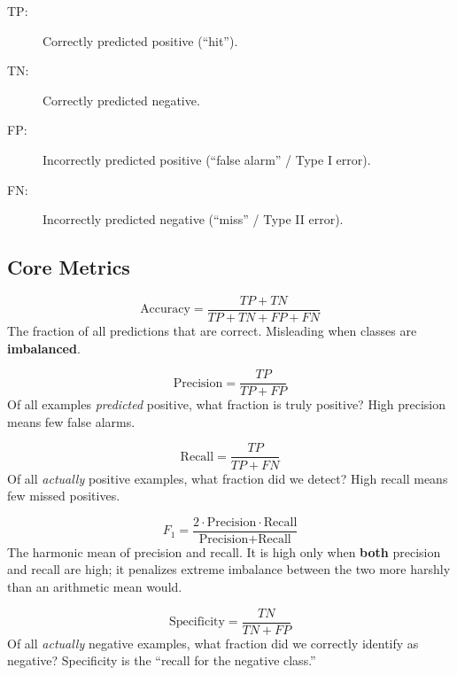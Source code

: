 \begin{description}
    \item[TP:] Correctly predicted positive (``hit'').
    \item[TN:] Correctly predicted negative.
    \item[FP:] Incorrectly predicted positive (``false alarm'' / Type I error).
    \item[FN:] Incorrectly predicted negative (``miss'' / Type II error).
\end{description}

\subsection*{Core Metrics}

\begin{definition}[Accuracy]
$$\text{Accuracy} = \frac{TP + TN}{TP + TN + FP + FN}$$
The fraction of all predictions that are correct. Misleading when classes are \textbf{imbalanced}.
\end{definition}

\begin{definition}[Precision]
$$\text{Precision} = \frac{TP}{TP + FP}$$
Of all examples \textit{predicted} positive, what fraction is truly positive? High precision means few false alarms.
\end{definition}

\begin{definition}
$$\text{Recall} = \frac{TP}{TP + FN}$$
Of all \textit{actually} positive examples, what fraction did we detect? High recall means few missed positives.
\end{definition}

\begin{definition}[F1 Score]
$$F_1 = \frac{2 \cdot \text{Precision} \cdot \text{Recall}}{\text{Precision} + \text{Recall}}$$
The harmonic mean of precision and recall. It is high only when \textbf{both} precision and recall are high; it penalizes extreme imbalance between the two more harshly than an arithmetic mean would.
\end{definition}

\begin{definition}[Specificity]
$$\text{Specificity} = \frac{TN}{TN + FP}$$
Of all \textit{actually} negative examples, what fraction did we correctly identify as negative? Specificity is the ``recall for the negative class.''
\end{definition}

